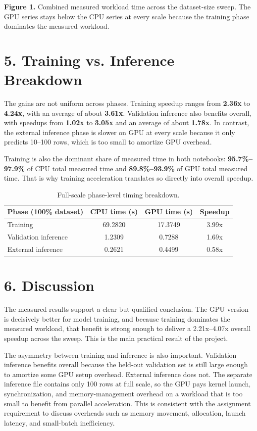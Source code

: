 \documentclass[10pt]{article}
\begin{document}
{\small
\textbf{Figure 1.} Combined measured workload time across the dataset-size sweep. The GPU series stays below the CPU series at every scale because the training phase dominates the measured workload.
}

\section*{5. Training vs. Inference Breakdown}
The gains are not uniform across phases. Training speedup ranges from \textbf{2.36x} to \textbf{4.24x}, with an average of about \textbf{3.61x}. Validation inference also benefits overall, with speedups from \textbf{1.02x} to \textbf{3.05x} and an average of about \textbf{1.78x}. In contrast, the external inference phase is slower on GPU at every scale because it only predicts 10--100 rows, which is too small to amortize GPU overhead.

Training is also the dominant share of measured time in both notebooks: \textbf{95.7\%--97.9\%} of CPU total measured time and \textbf{89.8\%--93.9\%} of GPU total measured time. That is why training acceleration translates so directly into overall speedup.

\begin{table}[h]
  \centering
  \small
  \begin{tabular}{lccc}
    \toprule
    Phase (100\% dataset) & CPU time (s) & GPU time (s) & Speedup \\
    \midrule
    Training & 69.2820 & 17.3749 & 3.99x \\
    Validation inference & 1.2309 & 0.7288 & 1.69x \\
    External inference & 0.2621 & 0.4499 & 0.58x \\
    \bottomrule
  \end{tabular}
  \caption{Full-scale phase-level timing breakdown.}
\end{table}

\newpage

\section*{6. Discussion}
The measured results support a clear but qualified conclusion. The GPU version is decisively better for model training, and because training dominates the measured workload, that benefit is strong enough to deliver a 2.21x--4.07x overall speedup across the sweep. This is the main practical result of the project.

The asymmetry between training and inference is also important. Validation inference benefits overall because the held-out validation set is still large enough to amortize some GPU setup overhead. External inference does not. The separate inference file contains only 100 rows at full scale, so the GPU pays kernel launch, synchronization, and memory-management overhead on a workload that is too small to benefit from parallel acceleration. This is consistent with the assignment requirement to discuss overheads such as memory movement, allocation, launch latency, and small-batch inefficiency.
\end{document}
